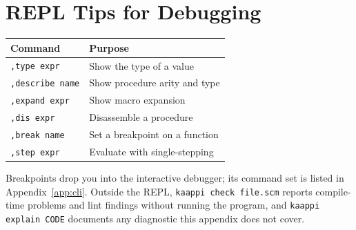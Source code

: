\section{REPL Tips for Debugging}

\begin{center}
\small
\begin{tabularx}{\textwidth}{@{}lY@{}}
\textbf{Command} & \textbf{Purpose} \\
\hline
\texttt{,type expr} & Show the type of a value \\
\texttt{,describe name} & Show procedure arity and type \\
\texttt{,expand expr} & Show macro expansion \\
\texttt{,dis expr} & Disassemble a procedure \\
\texttt{,break name} & Set a breakpoint on a function \\
\texttt{,step expr} & Evaluate with single-stepping \\
\end{tabularx}
\end{center}

Breakpoints drop you into the interactive debugger; its command set is listed in Appendix~\ref{app:cli}. Outside the REPL, \texttt{kaappi check file.scm} reports compile-time problems and lint findings without running the program, and \texttt{kaappi explain CODE} documents any diagnostic this appendix does not cover.
